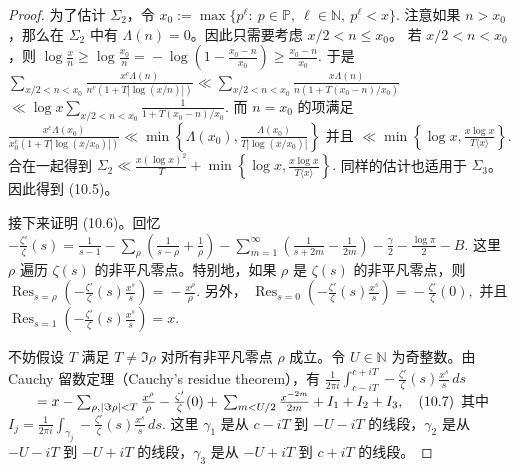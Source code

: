 \begin{proof}
	为了估计 $\Sigma_2$，令
	\(\textstyle x_0:=\allowbreak{}\max\{p^\ell:\ p\in\mathbb P,\allowbreak{}\ \ell\in\mathbb N,\allowbreak{}\ p^\ell<x\}.\)
	注意如果 $n>x_0$，那么在 $\Sigma_2$ 中有 $\Lambda(n)=0$。因此只需要考虑
	$x/2<n\leq x_0$。
	若 $x/2<n<x_0$，则
	\(\textstyle \log\frac{x}{n} \geq\allowbreak{} \log\frac{x_0}{n} =\allowbreak{} -\log\left(1-\frac{x_0-n}{x_0}\right) \geq\allowbreak{} \frac{x_0-n}{x_0}.\)
	于是
	\(\textstyle \sum_{x/2<n<x_0} \frac{x^c\Lambda(n)}{n^c(1+\allowbreak{}T|\log(x/n)|)} \ll\allowbreak{} \sum_{x/2<n<x_0} \frac{x\Lambda(n)}{n(1+\allowbreak{}T(x_0-n)/x_0)}\) \(\textstyle \ll\allowbreak{} \log x \sum_{x/2<n<x_0} \frac1{1+\allowbreak{}T(x_0-n)/x_0}.\)
	而 $n=x_0$ 的项满足
	\(\textstyle \frac{x^c\Lambda(x_0)}{x_0^c(1+\allowbreak{}T|\log(x/x_0)|)} \ll\allowbreak{} \min\left\{\Lambda(x_0),\allowbreak{}\frac{\Lambda(x_0)}{T|\log(x/x_0)|}\right\}\)
	并且
	\(\textstyle \ll\allowbreak{} \min\left\{ \log x,\allowbreak{} \frac{x\log x}{T\langle x\rangle} \right\}.\)
	合在一起得到
	\(\textstyle \Sigma_2 \ll\allowbreak{} \frac{x(\log x)^2}{T} +\allowbreak{} \min\left\{ \log x,\allowbreak{} \frac{x\log x}{T\langle x\rangle} \right\}.\)
	同样的估计也适用于 $\Sigma_3$。因此得到 (10.5)。

	接下来证明 (10.6)。回忆
	\(\textstyle -\frac{\zeta'}{\zeta}(s) =\allowbreak{} \frac1{s-1} - \sum_\rho \left(\frac1{s-\rho}+\allowbreak{}\frac1{\rho}\right) - \sum_{m=\allowbreak{}1}^{\infty} \left(\frac1{s+\allowbreak{}2m}-\frac1{2m}\right) - \frac{\gamma}{2} - \frac{\log\pi}{2} - B.\)
	这里 $\rho$ 遍历 $\zeta(s)$ 的非平凡零点。特别地，如果
	$\rho$ 是 $\zeta(s)$ 的非平凡零点，则
	\(\textstyle \operatorname*{Res}_{s=\allowbreak{}\rho} \left( -\frac{\zeta'}{\zeta}(s)\frac{x^s}{s} \right) =\allowbreak{} -\frac{x^\rho}{\rho}.\)
	另外，
	\(\textstyle \operatorname*{Res}_{s=\allowbreak{}0} \left( -\frac{\zeta'}{\zeta}(s)\frac{x^s}{s} \right) =\allowbreak{} -\frac{\zeta'}{\zeta}(0),\allowbreak{}\)
	并且
	\(\textstyle \operatorname*{Res}_{s=\allowbreak{}1} \left( -\frac{\zeta'}{\zeta}(s)\frac{x^s}{s} \right) =\allowbreak{} x.\)

	不妨假设 $T$ 满足
	\(\textstyle T\neq\allowbreak{} \Im\rho\)
	对所有非平凡零点 $\rho$ 成立。令 $U\in\mathbb N$ 为奇整数。由 Cauchy 留数定理（Cauchy's residue theorem），有
	\(\textstyle \frac1{2\pi i} \int_{c-iT}^{c+\allowbreak{}iT} -\frac{\zeta'}{\zeta}(s)\frac{x^s}{s}\,ds\) \(\textstyle \qquad=\allowbreak{} x - \sum_{\rho,\allowbreak{} |\Im\rho|<T}\frac{x^\rho}{\rho} - \frac{\zeta'}{\zeta}(0) +\allowbreak{} \sum_{m<U/2}\frac{x^{-2m}}{2m} +\allowbreak{} I_1+\allowbreak{}I_2+\allowbreak{}I_3,\allowbreak{} \quad\textup{(10.7)}\)
	其中
	\(\textstyle I_j =\allowbreak{} \frac1{2\pi i} \int_{\gamma_j} -\frac{\zeta'}{\zeta}(s)\frac{x^s}{s}\,ds.\)
	这里 $\gamma_1$ 是从 $c-iT$ 到 $-U-iT$ 的线段，$\gamma_2$ 是从
	$-U-iT$ 到 $-U+iT$ 的线段，$\gamma_3$ 是从 $-U+iT$ 到 $c+iT$ 的线段。


\end{proof}
